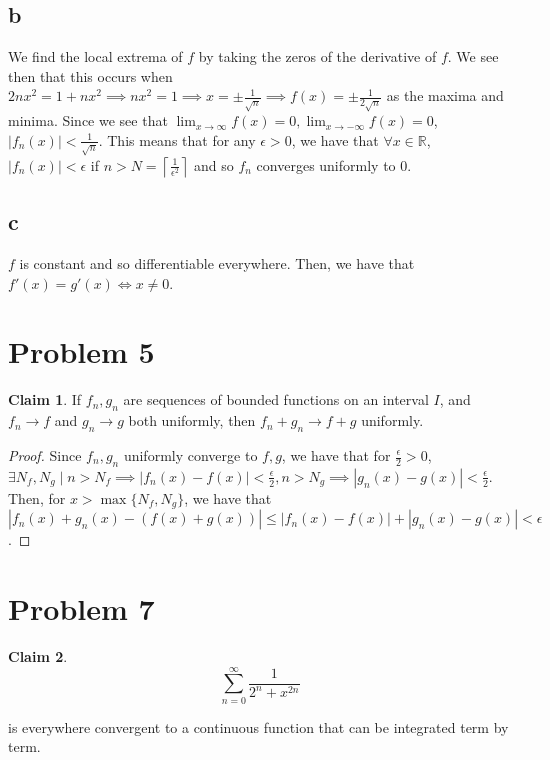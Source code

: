 \documentclass[12pt,letterpaper]{article}
\theoremstyle{definition}
\newtheorem*{claim}{Claim}
\newcommand{\R}{\mathbb{R}}
\begin{document}
\subsection*{b}

We find the local extrema of $f$ by taking the zeros of the derivative of $f$.
We see then that this occurs when $2nx^2 = 1 + nx^2 \implies nx^2 = 1 \implies x
= \pm \frac{1}{\sqrt{n}} \implies f(x) = \pm \frac{1}{2\sqrt{n}}$ as the maxima
and minima. Since we see that $\lim_{x\rightarrow \infty} f(x) = 0,
\lim_{x\rightarrow -\infty}f(x) = 0$, $|f_n(x)| < \frac{1}{\sqrt{n}}$. This means that
for any $\epsilon > 0$, we have that $\forall x \in \R$, $|f_n(x)| < \epsilon$
if $n > N = \left\lceil \frac{1}{\epsilon^2} \right\rceil$ and so $f_n$ converges
uniformly to $0$.

\subsection*{c}

$f$ is constant and so differentiable everywhere. Then, we have that $f'(x) =
g'(x) \iff x \neq 0$. 

\section*{Problem 5}

\begin{claim}
  If $f_n, g_n$ are sequences of bounded functions on an interval $I$, and $f_n
  \rightarrow f$ and $g_n \rightarrow g$ both uniformly, then $f_n + g_n
  \rightarrow f + g$ uniformly.
\end{claim}

\begin{proof}
  Since $f_n, g_n$ uniformly converge to $f, g$, we have that for
  $\frac{\epsilon}{2} > 0$, $\exists N_f, N_g
  \mid n > N_f \implies |f_n(x) - f(x)| < \frac{\epsilon}{2}, n > N_g \implies |g_n(x) -
  g(x)| < \frac{\epsilon}{2}$. Then, for $x > \max\{N_f, N_g\}$, we have that $|f_n(x) +
  g_n(x) - (f(x) + g(x))| \leq |f_n(x) - f(x)| + |g_n(x) - g(x)| < \epsilon$.
\end{proof}

\section*{Problem 7}

\begin{claim}
  \[
    \sum_{n=0}^\infty \frac{1}{2^n + x^{2n}} 
  \]

  is everywhere convergent to a continuous function that can be integrated term
  by term.
\end{claim}
\end{document}
